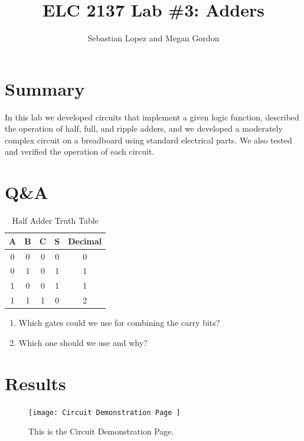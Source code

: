 \documentclass[11pt]{article}
\begin{document}
\title{ELC 2137 Lab \#3: Adders}
\author{Sebastian Lopez and Megan Gordon}

\maketitle


\section*{Summary}

In this lab we developed circuits that implement a given logic function, described the operation of half, full, and ripple adders, and we developed a moderately complex circuit on a breadboard using standard electrical parts. We also tested and verified the operation of each circuit. 

\section*{Q\&A}

\begin{table}[ht]\centering
	\caption{Half Adder Truth Table}
	\label{tbl:Logic_Truth_Table}
	\begin{tabular}{cc||cc||c}
		\toprule
		A & B & C & S & Decimal\\
		\midrule
		0 & 0 & 0 & 0 & 0\\
		0 & 1 & 0 & 1 & 1\\
		1 & 0 & 0 & 1 & 1\\
		1 & 1 & 1 & 0 & 2\\
		\bottomrule
	\end{tabular} 
\end{table} 

\begin{enumerate}
	\item Which gates could we use for combining the carry bits? 
	\item Which one should we use and why? 
\end{enumerate}

\section*{Results}

\begin{figure}[ht]\centering
	\texttt{[image: Circuit Demonstration Page ]}
	\caption{This is the Circuit Demonstration Page.}
	\label{fig:original_logo}			%
\end{figure}
\end{document}
